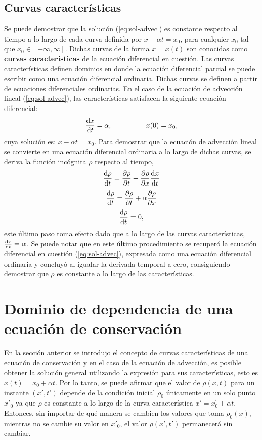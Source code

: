 \subsection{Curvas características}
Se puede demostrar que la solución (\ref{eq:sol-advec}) es constante respecto al tiempo a lo largo de cada curva definida por $x-\alpha t = x_0$, para cualquier $x_0$ tal que $x_0 \in [-\infty, \infty]$. Dichas curvas de la forma $x=x(t)$ son conocidas como \textbf{curvas características} de la ecuación diferencial en cuestión. Las curvas características definen dominios en donde la ecuación diferencial parcial se puede escribir como una ecuación diferencial ordinaria. Dichas curvas se definen a partir de ecuaciones diferenciales ordinarias. En el caso de la ecuación de advección lineal (\ref{eq:sol-advec}), las características satisfacen la siguiente ecuación diferencial:
\begin{equation}
	\dv{x}{t} = \alpha, \hspace{1.7cm} x(0) = x_0,
\end{equation}
cuya solución es: $x-\alpha t = x_0$. Para demostrar que la ecuación de advección lineal se convierte en una ecuación diferencial ordinaria a lo largo de dichas curvas, se deriva la función incógnita $\rho$ respecto al tiempo,
\begin{equation}
	\dv{\rho}{t} = \pdv{\rho}{t} + \pdv{\rho}{x}\dv{x}{t}
\end{equation}
\begin{equation}
	\dv{\rho}{t} = \pdv{\rho}{t} + \alpha\pdv{\rho}{x}
\end{equation}
\begin{equation}
	\dv{\rho}{t} = 0,
\end{equation}
este último paso toma efecto dado que a lo largo de las curvas características, $\dv{x}{t} = \alpha$. Se puede notar que en este último procedimiento se recuperó la ecuación diferencial en cuestión (\ref{eq:sol-advec}), expresada como una ecuación diferencial ordinaria y concluyó al igualar la derivada temporal a cero, consiguiendo demostrar que $\rho$ es constante a lo largo de las características.
\section{Dominio de dependencia de una ecuación de conservación}
En la sección anterior se introdujo el concepto de curvas características de una ecuación de conservación y en el caso de la ecuación de advección, es posible obtener la solución general utilizando la expresión para sus características, esto es $x(t) = x_0 + \alpha t$. Por lo tanto, se puede afirmar que el valor de $\rho(x,t)$ para un instante $(x',t')$ depende de la condición inicial $\rho_0$ únicamente en un solo punto $x'_{0}$ ya que $\rho$ es constante a lo largo de la curva característica $x' = x^{'}_{0} + \alpha t$. Entonces, sin importar de qué manera se cambien los valores que toma $\rho_0(x)$, mientras no se cambie su valor en $x'_0$, el valor $\rho(x',t')$ permanecerá sin cambiar. 

